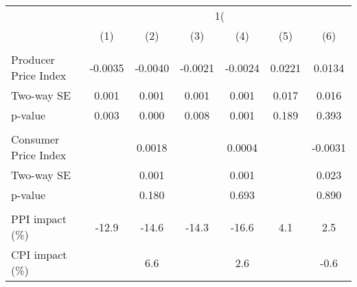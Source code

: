 {
\def\sym#1{\ifmmode^{#1}\else\(^{#1}\)\fi}
\begin{tabular}{l*{6}{c}}
\hline\hline
                    &&&\\\cmidrule(lr){2-3}\cmidrule(lr){4-5}\cmidrule(lr){6-7}
                    &         &         &         &         &         &         \\
\hline
\hline
\\ Producer Price Index&     -0.0035         &     -0.0040         &     -0.0021         &     -0.0024         &      0.0221         &      0.0134         \\
\hspace{15pt} Two-way SE&       0.001         &       0.001         &       0.001         &       0.001         &       0.017         &       0.016         \\
\hspace{25pt} p-value&       0.003         &       0.000         &       0.008         &       0.001         &       0.189         &       0.393         \\
\\ Consumer Price Index&                     &      0.0018         &                     &      0.0004         &                     &     -0.0031         \\
\hspace{15pt} Two-way SE&                     &       0.001         &                     &       0.001         &                     &       0.023         \\
\hspace{25pt} p-value&                     &       0.180         &                     &       0.693         &                     &       0.890         \\
\hline \\ PPI impact (\%)&       -12.9         &       -14.6         &       -14.3         &       -16.6         &         4.1         &         2.5         \\
CPI impact (\%)     &                     &         6.6         &                     &         2.6         &                     &        -0.6         \\

\end{tabular}}
